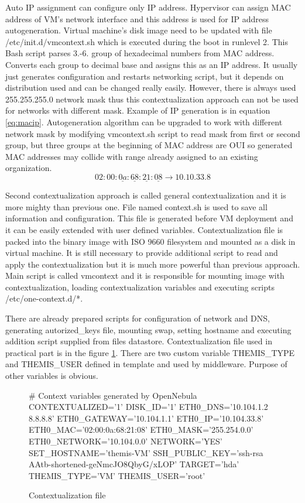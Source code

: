 Auto \Ac{IP} assignment can configure only \Ac{IP} address. Hypervisor can assign \Ac{MAC} address of \Ac{VM}'s network interface and this address is used for \Ac{IP} address autogeneration. Virtual machine's disk image need to be updated with file /etc/init.d/vmcontext.sh which is executed during the boot in runlevel 2. This \Ac{Bash} script parses 3.-6. group of hexadecimal numbers from \Ac{MAC} address. Converts each group to decimal base and assigns this as an \Ac{IP} address. It usually just generates configuration and restarts networking script, but it depends on distribution used and can be changed really easily.
However, there is always used 255.255.255.0 network mask thus this contextualization approach can not be used for networks with different mask. Example of \Ac{IP} generation is in equation \ref{eq:macip}. Autogeneration algorithm can be upgraded to work with different network mask by modifying vmcontext.sh script to read mask from first or second group, but three groups at the beginning of \Ac{MAC} address are \Ac{OUI} so generated \Ac{MAC} addresses may collide with range already assigned to an existing organization.
\begin{equation}
	\label{eq:macip}
	02:00:\underline{0a}:\underline{68}:\underline{21}:\underline{08} \rightarrow 10.10.33.8
\end{equation}

Second contextualization approach is called general contextualization and it is more mighty than previous one. File named context.sh is used to save all information and configuration. This file is generated before \Ac{VM} deployment and it can be easily extended with user defined variables.
Contextualization file is packed into the binary image with ISO 9660 filesystem and mounted as a disk in virtual machine.
It is still necessary to provide additional script to read and apply the contextualization but it is much more powerful than previous approach. Main script is called vmcontext and it is responsible for mounting image with contextualization, loading contextualization variables and executing scripts /etc/one-context.d/*. 

There are already prepared scripts for configuration of network and \Ac{DNS}, generating autorized\_keys file, mounting swap, setting hostname and executing addition script supplied from files datastore. Contextualization file used in practical part is in the figure \ref{code:contextualization}. There are two custom variable THEMIS\_TYPE and THEMIS\_USER defined in template and used by middleware. Purpose of other variables is obvious.

\begin{figure}[htb]
\caption{Contextualization file}
\label{code:contextualization}
\begin{verbatimtab}
# Context variables generated by OpenNebula
CONTEXTUALIZED='1'
DISK_ID='1'
ETH0_DNS='10.104.1.2 8.8.8.8'
ETH0_GATEWAY='10.104.1.1'
ETH0_IP='10.104.33.8'
ETH0_MAC='02:00:0a:68:21:08'
ETH0_MASK='255.254.0.0'
ETH0_NETWORK='10.104.0.0'
NETWORK='YES'
SET_HOSTNAME='themis-VM'
SSH_PUBLIC_KEY='ssh-rsa AAtb-shortened-geNmcJO8QbyG/xLOP'
TARGET='hda'
THEMIS_TYPE='VM'
THEMIS_USER='root'
\end{verbatimtab}
\end{figure}
